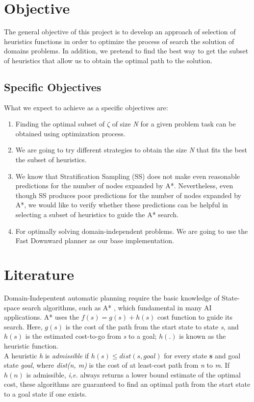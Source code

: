 \documentclass[11pt,a4paper,oneside]{report}
\begin{document}
\section{Objective}

The general objective of this project is to develop an approach of selection of heuristics functions in order to optimize the process of search the solution of domains problems. In addition, we pretend to find the best way to get the subset of heuristics that allow us to obtain the optimal path to the solution.

\subsection{Specific Objectives}
What we expect to achieve as a specific objectives are:
\begin{enumerate}
\item Finding the optimal subset of $\zeta$ of size \textit{N} for a given problem task can be obtained using optimization process.
\item We are going to try different strategies to obtain the size \textit{N} that fits the best the subset of heuristics.
\item We know that Stratification Sampling (SS) does not make even reasonable predictions for the number of nodes expanded by A*. Nevertheless, even though SS produces poor predictions for the number of nodes expanded by A*, we would like to verify whether these predictions can be helpful in selecting a subset of heuristics to guide the A* search.
\item For optimally solving domain-independent problems. We are going to use the Fast Downward planner as our base implementation.
\end{enumerate}

\section{Literature}
Domain-Indepentent automatic planning require the basic knowledge of State-space search algorithms, such as A* \citep{hart1968formal}, which fundamental in many AI applications. A* uses the $f(s) = g(s) + h(s)$ cost function to guide its search. Here, $g(s)$ is the cost of the path from the start state to state \textit{s}, and $h(s)$ is the estimated cost-to-go from \textit{s} to a goal; $h(.)$ is known as the heuristic function.\\

 A heuristic \textit{h} is \textit{admissible} if $h(s) \leq dist(s, goal)$ for every state \textbf{s} and goal state \textit{goal}, where \textit{dist(n, m)} is the cost of at least-cost path from \textit{n} to \textit{m}. If $h(n)$ is admissible, \textit{i,e.} always returns a lower bound estimate of the optimal cost, these algorithms are guaranteed to find an optimal path from the start state to a goal state if one exists.\\
\end{document}

